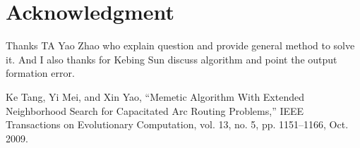 \documentclass[conference,compsoc]{IEEEtran}
\begin{document}
\section*{Acknowledgment}
Thanks TA Yao Zhao who explain question and provide general method to solve it.
And I also thanks for Kebing Sun discuss algorithm and point the output
formation error.


\begin{thebibliography}{1}
Ke Tang, Yi Mei, and Xin Yao, “Memetic Algorithm With Extended Neighborhood
Search for Capacitated Arc Routing Problems,” IEEE Transactions on Evolutionary
Computation, vol. 13, no. 5, pp. 1151–1166, Oct. 2009.

\end{thebibliography}

\end{document}
